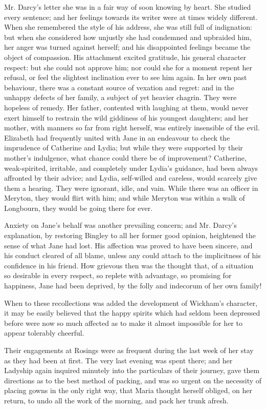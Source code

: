 \documentclass[12pt]{book}
\begin{document}
Mr. Darcy's letter she was in a fair way of soon knowing by heart. She studied every sentence; and her feelings towards its writer were at times widely different. When she remembered the style of his address, she was still full of indignation: but when she considered how unjustly she had condemned and upbraided him, her anger was turned against herself; and his disappointed feelings became the object of compassion. His attachment excited gratitude, his general character respect: but she could not approve him; nor could she for a moment repent her refusal, or feel the slightest inclination ever to see him again. In her own past behaviour, there was a constant source of vexation and regret: and in the unhappy defects of her family, a subject of yet heavier chagrin. They were hopeless of remedy. Her father, contented with laughing at them, would never exert himself to restrain the wild giddiness of his youngest daughters; and her mother, with manners so far from right herself, was entirely insensible of the evil. Elizabeth had frequently united with Jane in an endeavour to check the imprudence of Catherine and Lydia; but while they were supported by their mother's indulgence, what chance could there be of improvement? Catherine, weak-spirited, irritable, and completely under Lydia's guidance, had been always affronted by their advice; and Lydia, self-willed and careless, would scarcely give them a hearing. They were ignorant, idle, and vain. While there was an officer in Meryton, they would flirt with him; and while Meryton was within a walk of Longbourn, they would be going there for ever.

Anxiety on Jane's behalf was another prevailing concern; and Mr. Darcy's explanation, by restoring Bingley to all her former good opinion, heightened the sense of what Jane had lost. His affection was proved to have been sincere, and his conduct cleared of all blame, unless any could attach to the implicitness of his confidence in his friend. How grievous then was the thought that, of a situation so desirable in every respect, so replete with advantage, so promising for happiness, Jane had been deprived, by the folly and indecorum of her own family!

When to these recollections was added the development of Wickham's character, it may be easily believed that the happy spirits which had seldom been depressed before were now so much affected as to make it almost impossible for her to appear tolerably cheerful.

Their engagements at Rosings were as frequent during the last week of her stay as they had been at first. The very last evening was spent there; and her Ladyship again inquired minutely into the particulars of their journey, gave them directions as to the best method of packing, and was so urgent on the necessity of placing gowns in the only right way, that Maria thought herself obliged, on her return, to undo all the work of the morning, and pack her trunk afresh.
\end{document}
